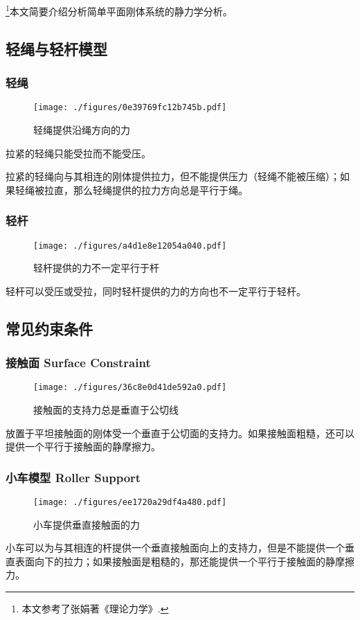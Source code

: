 
\footnote{本文参考了张娟著《理论力学》.}本文简要介绍分析简单平面刚体系统的静力学分析。

\subsection{轻绳与轻杆模型}
\subsubsection{轻绳}
\begin{figure}[ht]
\centering
\texttt{[image: ./figures/0e39769fc12b745b.pdf]}
\caption{轻绳提供沿绳方向的力} \label{fig_RGDFA_1}
\end{figure}
拉紧的轻绳只能受拉而不能受压。

拉紧的轻绳向与其相连的刚体提供拉力，但不能提供压力（轻绳不能被压缩）；如果轻绳被拉直，那么轻绳提供的拉力方向总是平行于绳。

\subsubsection{轻杆}
\begin{figure}[ht]
\centering
\texttt{[image: ./figures/a4d1e8e12054a040.pdf]}
\caption{轻杆提供的力不一定平行于杆} \label{fig_RGDFA_2}
\end{figure}
轻杆可以受压或受拉，同时轻杆提供的力的方向也不一定平行于轻杆。

\subsection{常见约束条件}
\subsubsection{接触面 Surface Constraint}
\begin{figure}[ht]
\centering
\texttt{[image: ./figures/36c8e0d41de592a0.pdf]}
\caption{接触面的支持力总是垂直于公切线} \label{fig_RGDFA_3}
\end{figure}

放置于平坦接触面的刚体受一个垂直于公切面的支持力。如果接触面粗糙，还可以提供一个平行于接触面的静摩擦力。
\subsubsection{小车模型 Roller Support}
\begin{figure}[ht]
\centering
\texttt{[image: ./figures/ee1720a29df4a480.pdf]}
\caption{小车提供垂直接触面的力} \label{fig_RGDFA_5}
\end{figure}
小车可以为与其相连的杆提供一个垂直接触面向上的支持力，但是不能提供一个垂直表面向下的拉力；如果接触面是粗糙的，那还能提供一个平行于接触面的静摩擦力。
